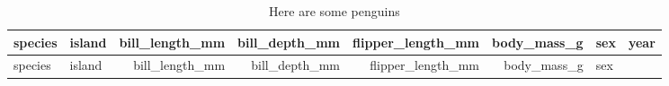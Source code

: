 \documentclass[
]{article}
\begin{document}
\begin{longtable}[]{@{}llrrrrlr@{}}
\caption{\label{tab:pen-tab}Here are some penguins}\tabularnewline
\toprule
\begin{minipage}[b]{0.07\columnwidth}\raggedright
species\strut
\end{minipage} & \begin{minipage}[b]{0.09\columnwidth}\raggedright
island\strut
\end{minipage} & \begin{minipage}[b]{0.13\columnwidth}\raggedleft
bill\_length\_mm\strut
\end{minipage} & \begin{minipage}[b]{0.12\columnwidth}\raggedleft
bill\_depth\_mm\strut
\end{minipage} & \begin{minipage}[b]{0.16\columnwidth}\raggedleft
flipper\_length\_mm\strut
\end{minipage} & \begin{minipage}[b]{0.11\columnwidth}\raggedleft
body\_mass\_g\strut
\end{minipage} & \begin{minipage}[b]{0.06\columnwidth}\raggedright
sex\strut
\end{minipage} & \begin{minipage}[b]{0.04\columnwidth}\raggedleft
year\strut
\end{minipage}\tabularnewline
\midrule
\endfirsthead
\toprule
\begin{minipage}[b]{0.07\columnwidth}\raggedright
species\strut
\end{minipage} & \begin{minipage}[b]{0.09\columnwidth}\raggedright
island\strut
\end{minipage} & \begin{minipage}[b]{0.13\columnwidth}\raggedleft
bill\_length\_mm\strut
\end{minipage} & \begin{minipage}[b]{0.12\columnwidth}\raggedleft
bill\_depth\_mm\strut
\end{minipage} & \begin{minipage}[b]{0.16\columnwidth}\raggedleft
flipper\_length\_mm\strut
\end{minipage} & \begin{minipage}[b]{0.11\columnwidth}\raggedleft
body\_mass\_g\strut
\end{minipage} & \begin{minipage}[b]{0.06\columnwidth}\raggedright
sex\strut

\end{minipage}
\end{longtable}
\end{document}
